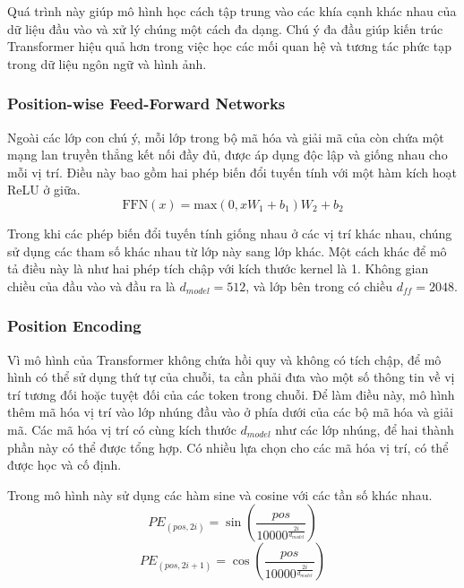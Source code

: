 Quá trình này giúp mô hình học cách tập trung vào các khía cạnh khác nhau của dữ liệu đầu vào và xử lý chúng một cách đa dạng. Chú ý đa đầu giúp kiến trúc Transformer hiệu quả hơn trong việc học các mối quan hệ và tương tác phức tạp trong dữ liệu ngôn ngữ và hình ảnh.

\subsubsection*{Position-wise Feed-Forward Networks}
Ngoài các lớp con chú ý, mỗi lớp trong bộ mã hóa và giải mã của còn chứa một mạng lan truyền thẳng kết nối đầy đủ, được áp dụng độc lập và giống nhau cho mỗi vị trí. Điều này bao gồm hai phép biến đổi tuyến tính với một hàm kích hoạt ReLU ở giữa.
\[
    \text{FFN}(x) = \text{max}(0, xW_1 + b_1)W_2 + b_2    
\]

Trong khi các phép biến đổi tuyến tính giống nhau ở các vị trí khác nhau, chúng sử dụng các tham số khác nhau từ lớp này sang lớp khác. Một cách khác để mô tả điều này là như hai phép tích chập với kích thước kernel là 1. Không gian chiều của đầu vào và đầu ra là $d_{model} = 512$, và lớp bên trong có chiều $d_{ff} = 2048$.

\subsubsection*{Position Encoding}
Vì mô hình của Transformer không chứa hồi quy và không có tích chập, để mô hình có thể sử dụng thứ tự của chuỗi, ta cần phải đưa vào một số thông tin về vị trí tương đối hoặc tuyệt đối của các token trong chuỗi. Để làm điều này, mô hình thêm mã hóa vị trí vào lớp nhúng đầu vào ở phía dưới của các bộ mã hóa và giải mã. Các mã hóa vị trí có cùng kích thước $d_{model}$ như các lớp nhúng, để hai thành phần này có thể được tổng hợp. Có nhiều lựa chọn cho các mã hóa vị trí, có thể được học và cố định.

Trong mô hình này sử dụng các hàm sine và cosine với các tần số khác nhau.
\[
    PE_{(pos, 2i)} = \sin(\frac{pos}{10000^{\frac{2i}{d_{model}}}})    
\]
\[
    PE_{(pos, 2i+1)} = \cos(\frac{pos}{10000^{\frac{2i}{d_{model}}}})    
\]

